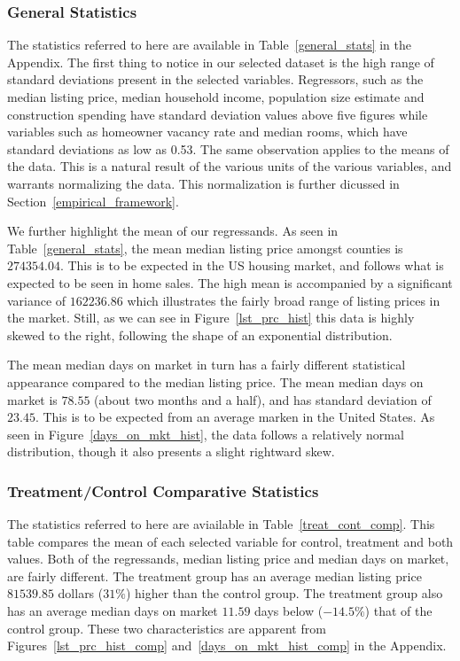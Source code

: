 \subsubsection{General Statistics}

The statistics referred to here are available in Table~\ref{general_stats} in the Appendix. The first thing to notice in our selected dataset is the high range of standard deviations present in the selected variables. Regressors, such as the median listing price, median household income, population size estimate and construction spending have standard deviation values above five figures while variables such as homeowner vacancy rate and median rooms, which have standard deviations as low as 0.53. The same observation applies to the means of the data. This is a natural result of the various units of the various variables, and warrants normalizing the data. This normalization is further dicussed in Section~\ref{empirical_framework}.

We further highlight the mean of our regressands. As seen in Table~\ref{general_stats}, the mean median listing price amongst counties is $274354.04$. This is to be expected in the US housing market, and follows what is expected to be seen in home sales. The high mean is accompanied by a significant variance of $162236.86$ which illustrates the fairly broad range of listing prices in the market. Still, as we can see in Figure~\ref{lst_prc_hist} this data is highly skewed to the right, following the shape of an exponential distribution.

The mean median days on market in turn has a fairly different statistical appearance compared to the median listing price. The mean median days on market is $78.55$ (about two months and a half), and has standard deviation of $23.45$. This is to be expected from an average marken in the United States. As seen in Figure~\ref{days_on_mkt_hist}, the data follows a relatively normal distribution, though it also presents a slight rightward skew.


\subsubsection{Treatment/Control Comparative Statistics}

The statistics referred to here are aviailable in Table~\ref{treat_cont_comp}. This table compares the mean of each selected variable for control, treatment and both values. Both of the regressands, median listing price and median days on market, are fairly different. The treatment group has an average median listing price $81539.85$ dollars ($31\%$) higher than the control group. The treatment group also has an average median days on market $11.59$ days below ($-14.5\%$) that of the control group. These two characteristics are apparent from Figures~\ref{lst_prc_hist_comp} and~\ref{days_on_mkt_hist_comp} in the Appendix. 

